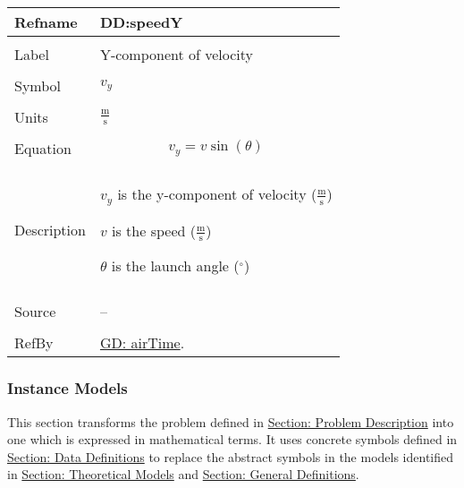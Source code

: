 \documentclass[12pt]{article}
\begin{document}
\noindent \begin{minipage}{\textwidth}
\begin{tabular}{p{} p{}}
\toprule \textbf{Refname} & \textbf{DD:speedY}
\label{DD:speedY}
\\ \midrule \\
Label & Y-component of velocity
\\ \midrule \\
Symbol & ${v_{y}}$
\\ \midrule \\
Units & $\frac{\text{m}}{\text{s}}$
\\ \midrule \\
Equation & \begin{displaymath}
           {v_{y}}=v \sin\left(θ\right)
           \end{displaymath}
\\ \midrule \\
Description & \begin{symbDescription}
              \item{${v_{y}}$ is the y-component of velocity ($\frac{\text{m}}{\text{s}}$)}
              \item{$v$ is the speed ($\frac{\text{m}}{\text{s}}$)}
              \item{$θ$ is the launch angle (${}^{\circ}$)}
              \end{symbDescription}
\\ \midrule \\
Source & --
\\ \midrule \\
RefBy & \hyperref[GD:airTime]{GD: airTime}.
\\ \bottomrule \end{tabular}
\end{minipage}
\subsubsection{Instance Models}
\label{Sec:IMs}
This section transforms the problem defined in \hyperref[Sec:ProbDesc]{Section: Problem Description} into one which is expressed in mathematical terms. It uses concrete symbols defined in \hyperref[Sec:DDs]{Section: Data Definitions} to replace the abstract symbols in the models identified in \hyperref[Sec:TMs]{Section: Theoretical Models} and \hyperref[Sec:GDs]{Section: General Definitions}.
\par~
\end{document}
